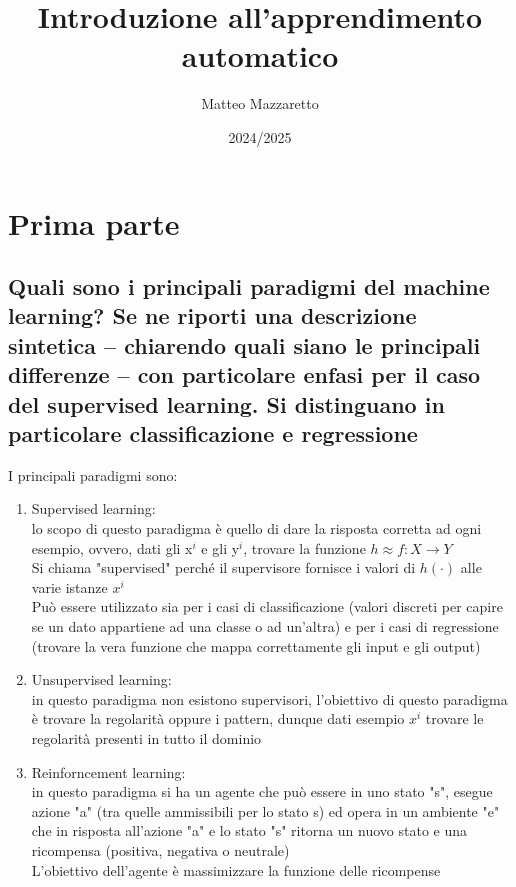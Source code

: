 \documentclass[10pt,oneside,a4paper]{article}
\title{Introduzione all'apprendimento automatico}
\author{Matteo Mazzaretto}
\date{2024/2025}
\begin{document}
\maketitle
\begin{center}
\renewcommand{\contentsname}{Indice}
\tableofcontents
\end{center}
\newpage
\setcounter{page}{1}
\section{Prima parte}
	\subsection{Quali sono i principali paradigmi del machine learning? Se ne riporti una descrizione
		sintetica – chiarendo quali siano le principali differenze – con particolare enfasi per il caso
		del supervised learning. Si distinguano in particolare classificazione e regressione}
 	I principali paradigmi sono:
	\begin{enumerate}
		\item Supervised learning:\\
			lo scopo di questo paradigma è quello di dare la risposta corretta ad ogni esempio, ovvero, dati gli x$^i$ e gli y$^i$, trovare la funzione $h\approx f:X \to Y$\\
			Si chiama "supervised" perché il supervisore fornisce i valori di $h(\cdot)$ alle varie istanze $x^i$\\
			Può essere utilizzato sia per i casi di classificazione (valori discreti per capire se un dato appartiene ad una classe o ad un'altra) e per i casi di regressione (trovare la vera funzione che mappa correttamente gli input e gli output)
		\item Unsupervised learning:\\
			in questo paradigma non esistono supervisori, l'obiettivo di questo paradigma è trovare la regolarità oppure i pattern, dunque dati esempio $x^i$ trovare le regolarità presenti in tutto il dominio
		\item Reinforncement learning:\\
			in questo paradigma si ha un agente che può essere in uno stato "s", esegue azione "a" (tra quelle ammissibili per lo stato s) ed opera in un ambiente "e" che in risposta all'azione "a" e lo stato "s" ritorna un nuovo stato e una ricompensa (positiva, negativa o neutrale)\\
			L'obiettivo dell'agente è massimizzare la funzione delle ricompense
	\end{enumerate}
\end{document}
